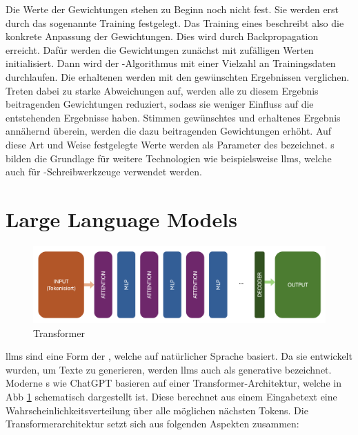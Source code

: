 \documentclass[../main.tex]{subfiles}
\begin{document}
Die Werte der Gewichtungen stehen zu Beginn noch nicht fest. Sie werden erst durch das sogenannte Training festgelegt. Das Training eines  beschreibt also die konkrete Anpassung der 
Gewichtungen. Dies wird durch Backpropagation erreicht. Dafür werden die Gewichtungen zunächst mit zufälligen Werten initialisiert. Dann wird der -Algorithmus mit einer Vielzahl an 
Trainingsdaten durchlaufen. Die erhaltenen werden mit den gewünschten Ergebnissen verglichen. Treten dabei zu starke Abweichungen auf, werden alle zu diesem Ergebnis beitragenden 
Gewichtungen reduziert, sodass sie weniger Einfluss auf die entstehenden Ergebnisse haben. Stimmen gewünschtes und erhaltenes Ergebnis annähernd überein, werden die dazu beitragenden 
Gewichtungen erhöht. Auf diese Art und Weise festgelegte Werte werden als Parameter des  bezeichnet.
s bilden die Grundlage für weitere Technologien wie beispielsweise \glspl{llm}, welche auch für -Schreibwerkzeuge verwendet werden. 

\section{Large Language Models}

\begin{figure}[h!]
  \includegraphics[scale=0.37]{bilder/Transformer.png}
  \caption{Transformer}
  \label{fig:trans}
\end{figure}
\glspl{llm} sind eine Form der , welche auf natürlicher Sprache basiert. Da sie entwickelt wurden, um Texte zu generieren, werden \glspl{llm} auch als generative  bezeichnet.
Moderne s wie ChatGPT basieren auf einer Transformer-Architektur, welche in Abb \ref{fig:trans} schematisch dargestellt ist. Diese berechnet aus einem Eingabetext eine Wahrscheinlichkeitsverteilung 
über alle möglichen nächsten Tokens. Die Transformerarchitektur setzt sich aus folgenden Aspekten zusammen:\cite{architecture}\\
\end{document}
